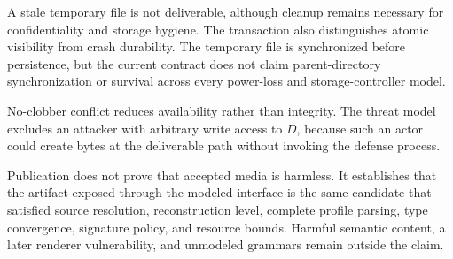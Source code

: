 A stale temporary file is not deliverable, although cleanup remains necessary
for confidentiality and storage hygiene. The transaction also distinguishes
atomic visibility from crash durability. The temporary file is synchronized
before persistence, but the current contract does not claim parent-directory
synchronization or survival across every power-loss and storage-controller
model.

No-clobber conflict reduces availability rather than integrity. The threat model
excludes an attacker with arbitrary write access to $D$, because such an actor
could create bytes at the deliverable path without invoking the defense process.

Publication does not prove that accepted media is harmless. It establishes that
the artifact exposed through the modeled interface is the same candidate that
satisfied source resolution, reconstruction level, complete profile parsing,
type convergence, signature policy, and resource bounds. Harmful semantic
content, a later renderer vulnerability, and unmodeled grammars remain outside
the claim.

